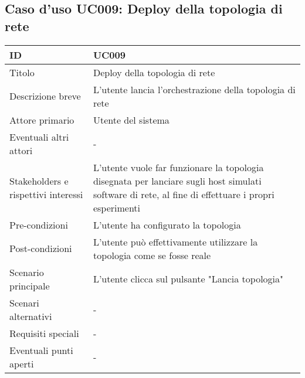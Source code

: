 \documentclass[../../main.tex]{subfiles}
\begin{document}
\subsection{Caso d’uso UC009: Deploy della topologia di rete }
\begin{tabularx}{150mm}{|l|X|}
    \hline
    ID                                  & \textbf{UC009}\\
    \hline
    Titolo                              & Deploy della topologia di rete \\
    \hline
    Descrizione breve                   & L'utente lancia l'orchestrazione della topologia di rete   \\
    \hline
    Attore primario                     & Utente del sistema   \\
    \hline
    Eventuali altri attori              & -   \\
    \hline
    Stakeholders e rispettivi interessi & L'utente vuole far funzionare la topologia disegnata per lanciare sugli host simulati software di rete, al fine di effettuare i propri esperimenti   \\
    \hline
    Pre-condizioni                      & L'utente ha configurato la topologia   \\
    \hline
    Post-condizioni                     & L'utente può effettivamente utilizzare la topologia come se fosse reale   \\
    \hline
    Scenario principale                 & L'utente clicca sul pulsante "Lancia topologia"   \\
    \hline
    Scenari alternativi                 & -   \\
    \hline
    Requisiti speciali                  & -   \\
    \hline
    Eventuali punti aperti              & -   \\
    \hline
\end{tabularx}
\newpage
\end{document}
